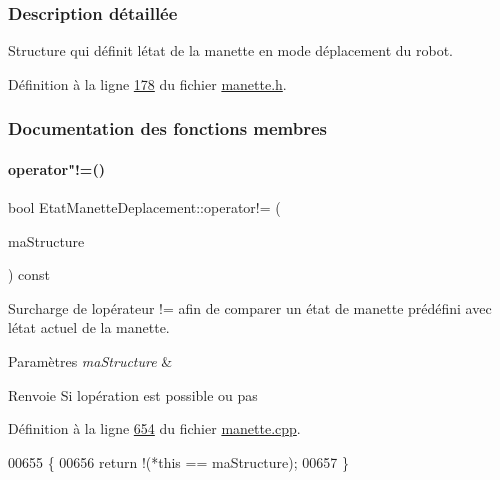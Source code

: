 \subsubsection{Description détaillée}
Structure qui définit l\textquotesingle{}état de la manette en mode déplacement du robot. 

Définition à la ligne \hyperlink{manette_8h_source_l00178}{178} du fichier \hyperlink{manette_8h_source}{manette.\+h}.



\subsubsection{Documentation des fonctions membres}
\mbox{\label{struct_etat_manette_deplacement_aa57df0ecb60478f389d84c6e5d0cc1b8}} 
\paragraph{\texorpdfstring{operator"!=()}{operator!=()}}
{\footnotesize\ttfamily bool Etat\+Manette\+Deplacement\+::operator!= (\begin{DoxyParamCaption}\item[{const \hyperlink{struct_etat_manette_deplacement}{Etat\+Manette\+Deplacement} \&}]{ma\+Structure }\end{DoxyParamCaption}) const}



Surcharge de l\textquotesingle{}opérateur != afin de comparer un état de manette prédéfini avec l\textquotesingle{}état actuel de la manette. 


\begin{DoxyParams}{Paramètres}
{\em ma\+Structure} & \\
\hline
\end{DoxyParams}
\begin{DoxyReturn}{Renvoie}
Si l\textquotesingle{}opération est possible ou pas 
\end{DoxyReturn}


Définition à la ligne \hyperlink{manette_8cpp_source_l00654}{654} du fichier \hyperlink{manette_8cpp_source}{manette.\+cpp}.


\begin{DoxyCode}
00655 \{
00656     \textcolor{keywordflow}{return} !(*\textcolor{keyword}{this} == maStructure);
00657 \}
\end{DoxyCode}
\mbox{\label{struct_etat_manette_deplacement_a8f248b6ec1788c058e161b74fb371c5b}} 
